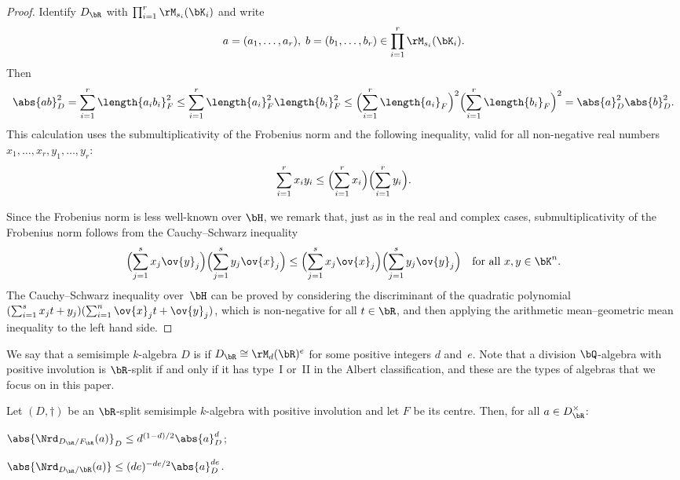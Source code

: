 \begin{proof}
Identify $D_\bR$ with $\prod_{i=1}^r \rM_{s_i}(\bK_i)$ and write
\[
a = (a_1, \dotsc, a_r), \; b = (b_1, \dotsc, b_r) \in \prod_{i=1}^r \rM_{s_i}(\bK_i).
\]
Then
\[
\abs{ab}_D^2
= \sum_{i=1}^r \length{a_ib_i}_F^2
\leq \sum_{i=1}^r \length{a_i}_F^2 \length{b_i}_F^2
\leq \Bigl( \sum_{i=1}^r \length{a_i}_F \Bigr)^2 \Bigl( \sum_{i=1}^r \length{b_i}_F \Bigr)^2
= \abs{a}_D^2 \abs{b}_D^2.
\]
This calculation uses the submultiplicativity of the Frobenius norm and the following inequality, valid for all non-negative real numbers $x_1, \dotsc, x_r, y_1, \dotsc, y_r$:
\begin{equation} \label{eqn:sum-squares}
\sum_{i=1}^r x_iy_i \leq \Bigl( \sum_{i=1}^r x_i \Bigr) \Bigl( \sum_{i=1}^r y_i \Bigr).
\end{equation}

Since the Frobenius norm is less well-known over $\bH$, we remark that, just as in the real and complex cases, submultiplicativity of the Frobenius norm follows from the Cauchy--Schwarz inequality
\[
\Bigl( \sum_{j=1}^s x_j \ov{y}_j \Bigr) \Bigl( \sum_{j=1}^s y_j \ov{x}_j \Bigr) \leq \Bigl( \sum_{j=1}^s x_j \ov{x}_j \Bigr) \Bigl( \sum_{j=1}^s y_j \ov{y}_j \Bigr) \quad\text{for all } x, y \in \bK^n.
\]
The Cauchy--Schwarz inequality over~$\bH$ can be proved by considering the discriminant of the quadratic polynomial $(\sum_{i=1}^s x_j t + y_j)(\sum_{i=1}^n \ov{x}_j t + \ov{y}_j)$, which is non-negative for all $t \in \bR$, and then applying the arithmetic mean--geometric mean inequality to the left hand side.
\end{proof}

We say that a semisimple $k$-algebra $D$ is  if $D_\bR \cong \rM_d(\bR)^e$ for some positive integers $d$ and~$e$.
Note that a division $\bQ$-algebra with positive involution is $\bR$-split if and only if it has type~I or~II in the Albert classification, and these are the types of algebras that we focus on in this paper.

\begin{lemma} \label{Nrd-length-bound}
Let $(D, \dag)$ be an $\bR$-split semisimple $k$-algebra with positive involution and let $F$ be its centre.
Then, for all $a \in D_\bR^\times$:
\begin{enumeratei}
\item $\abs{\Nrd_{D_\bR/F_\bR}(a)}_D \leq d^{(1-d)/2} \abs{a}_D^d$;
\item $\abs{\Nrd_{D_\bR/\bR}(a)} \leq (de)^{-de/2} \abs{a}_D^{de}$.
\end{enumeratei}
\end{lemma}

